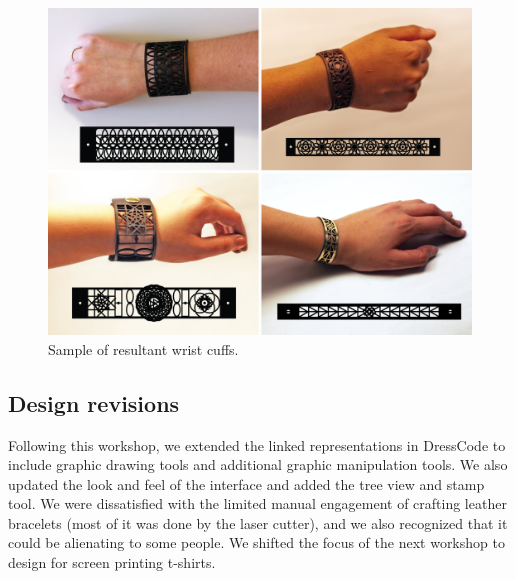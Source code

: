 \documentclass{sigchi}
\begin{document}
\begin{figure}
\begin{center}
\includegraphics[width=0.75\columnwidth]{images/bracelet_results.png}
\caption{Sample of resultant wrist cuffs.}
\label{fig:bracelet_results}
\end{center}
\end{figure}

\subsection{Design revisions} Following this workshop, we extended the linked representations in DressCode to include graphic drawing tools and additional graphic manipulation tools. We also updated the look and feel of the interface and added the tree view and stamp tool. We were dissatisfied with the limited manual engagement of crafting leather bracelets (most of it was done by the laser cutter), and we also recognized that it could be alienating to some people. We shifted the focus of the next workshop to design for screen printing t-shirts.
\end{document}
